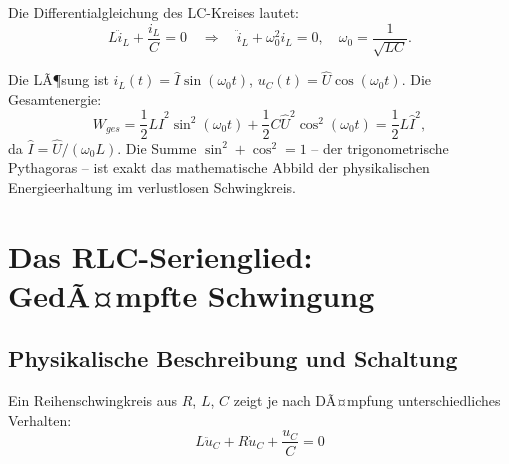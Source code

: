 ﻿\documentclass[12pt, a4paper]{article}
\begin{document}
	Die Differentialgleichung des LC-Kreises lautet:
	\begin{equation}
		L \ddot{i}_L + \frac{i_L}{C} = 0 \quad \Rightarrow \quad \ddot{i}_L + \omega_0^2 i_L = 0, \quad \omega_0 = \frac{1}{\sqrt{LC}}.
	\end{equation}
	
	Die LÃ¶sung ist $i_L(t) = \hat{I}\sin(\omega_0 t)$, $u_C(t) = \hat{U}\cos(\omega_0 t)$. Die Gesamtenergie:
	\begin{equation}
		W_{ges} = \frac{1}{2}L\hat{I}^2\sin^2(\omega_0 t) + \frac{1}{2}C\hat{U}^2\cos^2(\omega_0 t) = \frac{1}{2}L\hat{I}^2,
	\end{equation}
	da $\hat{I} = \hat{U}/(\omega_0 L)$. Die Summe $\sin^2 + \cos^2 = 1$ -- der trigonometrische Pythagoras -- ist exakt das mathematische Abbild der physikalischen Energieerhaltung im verlustlosen Schwingkreis.
	
	\section{Das RLC-Serienglied: GedÃ¤mpfte Schwingung}
	
	\subsection{Physikalische Beschreibung und Schaltung}
	
	Ein Reihenschwingkreis aus $R$, $L$, $C$ zeigt je nach DÃ¤mpfung unterschiedliches Verhalten:
	\begin{equation}
		L \ddot{u}_C + R \dot{u}_C + \frac{u_C}{C} = 0
	\end{equation}
	
\end{document}
